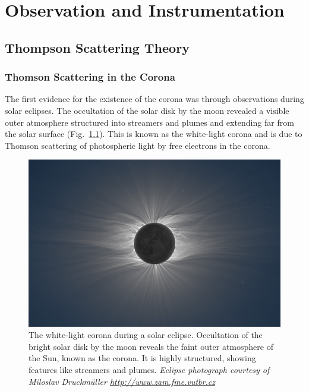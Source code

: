 

\chapter{Observation and Instrumentation} 
\label{chap:3}

\section{Thompson Scattering Theory}\label{sec:1}

\subsection{Thomson Scattering in the Corona}\label{sec:10}

The first evidence for the existence of the corona was through observations during solar eclipses. The occultation of the solar disk by the moon revealed a visible outer atmosphere structured into streamers and plumes and extending far from the solar surface (Fig.~\ref{fig:eclipse}). This is known as the white-light corona and is due to Thomson scattering of photospheric light by free electrons in the corona.
\begin{figure}[t!]
\begin{center}
\includegraphics[scale=0.45]{images/solar_eclipse}
\caption[White-light corona during an eclipse]{The white-light corona during a solar eclipse. Occultation of the bright solar disk by the moon reveals the faint outer atmosphere of the Sun, known as the corona. It is highly structured, showing features like streamers and plumes. {\it Eclipse photograph courtesy of Miloslav Druckm\"{u}ller \href{http://www.zam.fme.vutbr.cz/~druck/Index.htm}{http://www.zam.fme.vutbr.cz}}}
\end{center}
\label{fig:eclipse}
\end{figure}

